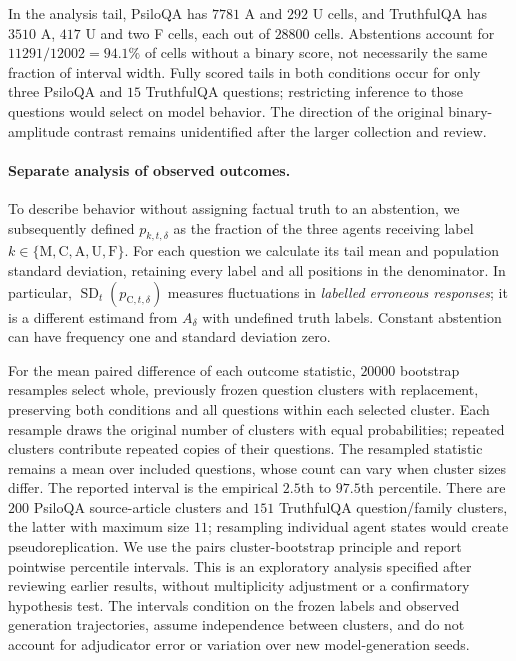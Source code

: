 \documentclass[11pt]{article}
\theoremstyle{definition}
\begin{document}
In the analysis tail, PsiloQA has $7781$ A and $292$ U cells, and TruthfulQA has $3510$ A,
$417$ U and two F cells, each out of $28800$ cells. Abstentions account for $11291/12002=94.1\%$
of cells without a binary score, not necessarily the same fraction of interval width. Fully
scored tails in both conditions occur for only three PsiloQA and $15$ TruthfulQA questions;
restricting inference to those questions would select on model behavior. The direction of the
original binary-amplitude contrast remains unidentified after the larger collection and review.

\paragraph{Separate analysis of observed outcomes.}
To describe behavior without assigning factual truth to an abstention, we subsequently defined
$p_{k,t,\delta}$ as the fraction of the three agents receiving label $k\in\{\mathrm M,\mathrm C,
\mathrm A,\mathrm U,\mathrm F\}$. For each question we calculate its tail mean and population
standard deviation, retaining every label and all positions in the denominator. In particular,
$\operatorname{SD}_t(p_{\mathrm C,t,\delta})$ measures fluctuations in \emph{labelled erroneous
responses}; it is a different estimand from $A_\delta$ with undefined truth labels. Constant abstention
can have frequency one and standard deviation zero.

For the mean paired difference of each outcome statistic, $20000$ bootstrap resamples select
whole, previously frozen question clusters with replacement, preserving both conditions and all
questions within each selected cluster. Each resample draws the original number of clusters
with equal probabilities; repeated clusters contribute repeated copies of their questions.
The resampled statistic remains a mean over included questions, whose count can vary when
cluster sizes differ. The reported interval is the empirical $2.5$th to $97.5$th percentile.
There are $200$ PsiloQA source-article clusters and $151$ TruthfulQA question/family clusters,
the latter with maximum size $11$; resampling individual agent states would create
pseudoreplication. We use the pairs cluster-bootstrap principle \cite{CameronMiller} and report
pointwise percentile intervals. This is an exploratory analysis specified after reviewing earlier
results, without multiplicity adjustment or a confirmatory hypothesis test. The intervals condition
on the frozen labels and observed generation trajectories, assume independence between clusters,
and do not account for adjudicator error or variation over new model-generation seeds.
\end{document}
